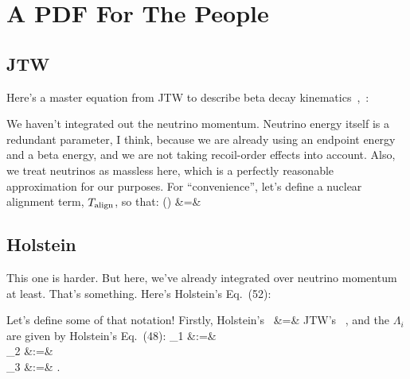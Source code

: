 


\chapter[A PDF]{A PDF For The People}
\label{appendix_forthepeople}
\label{appendix_forthepeople_old}

\section[JTW]{JTW}
Here's a master equation from JTW to describe beta decay kinematics~\cite{jtw},~\cite{jtw_coulomb}:



We haven't integrated out the neutrino momentum.  Neutrino energy itself is a redundant parameter, I think, because we are already using an endpoint energy and a beta energy, and we are not taking recoil-order effects into account.  Also, we treat neutrinos as massless here, which is a perfectly reasonable approximation for our purposes.  For ``convenience'', let's define a nuclear alignment term, $T_{\mathrm{align}}$, so that:
\bea
\Talign(\vecJ) &=& \TalignExpand
\eea

\section[Holstein]{Holstein}
This one is harder.  But here, we've already integrated over neutrino momentum at least.  That's something.  Here's Holstein's Eq.~(52):





Let's define some of that notation!
Firstly, 
\bea
\textrm{Holstein's \,} \hatn &=& \textrm{JTW's \,} \hatj,
\label{eq:nequalsj}
\eea
and the 
$\Lambda_i$ are given by Holstein's Eq.~(48):
\bea
    \Lambda_1   &:=& \LambdaOne   
    \label{eq:lambda1} \\
    \Lambda_2   &:=& \LambdaTwo 
    \label{eq:lambda2} \\
    \Lambda_3   &:=& \LambdaThree .
    \label{eq:lambda3}
\eea


